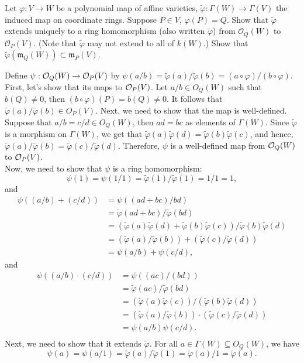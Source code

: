 \begin{exercise}
    Let $\varphi : V \to W$ be a polynomial map of affine varieties, $\tilde{\varphi} : \Gamma(W) \to \Gamma(V)$ the induced map on coordinate rings. Suppose $P \in V$, $\varphi(P) = Q$. Show that $\tilde{\varphi}$ extends uniquely to a ring homomorphism (also written $\tilde{\varphi}$) from $\mathcal{O}_Q(W)$ to $\mathcal{O}_P(V)$. (Note that $\tilde{\varphi}$ may not extend to all of $k(W)$.) Show that $\tilde{\varphi}(\mathfrak{m}_Q(W)) \subset \mathfrak{m}_P(V)$. \\
\end{exercise}

\begin{solution}
    Define $\psi : \mathcal{O}_Q(W) \to \mathcal{O}_P(V)$ by $\psi(a/b) = \tilde{\varphi}(a)/\tilde{\varphi}(b) = (a \circ \varphi)/(b \circ \varphi)$. First, let's show that its maps to $\mathcal{O}_P(V)$. Let $a/b \in O_Q(W)$ such that $b(Q) \neq 0$, then $(b\circ \varphi)(P) = b(Q) \neq 0$. It follows that $\tilde{\varphi}(a) / \tilde{\varphi}(b) \in O_P(V)$. Next, we need to show that the map is well-defined. Suppose that $a/b = c/d \in O_Q(W)$, then $ad = bc$ as elements of $\Gamma(W)$. Since $\tilde{\varphi}$ is a morphism on $\Gamma(W)$, we get that $\tilde{\varphi}(a)\tilde{\varphi}(d) = \tilde{\varphi}(b)\tilde{\varphi}(c)$, and hence, $\tilde{\varphi}(a)/\tilde{\varphi}(b) = \tilde{\varphi}(c)/\tilde{\varphi}(d)$. Therefore, $\psi$ is a well-defined map from $\mathcal{O}_Q(W)$ to $\mathcal{O}_P(V)$.\\
    
    Now, we need to show that $\psi$ is a ring homomorphism:
    $$\psi(1) = \psi(1/1) = \tilde{\varphi}(1)/\tilde{\varphi}(1) = 1/1 = 1,$$
    and
    \begin{align*}
        \psi((a/b) + (c/d)) &= \psi((ad + bc)/bd) \\
        &= \tilde{\varphi}(ad+bc)/\tilde{\varphi}(bd) \\
        &= (\tilde{\varphi}(a)\tilde{\varphi}(d) + \tilde{\varphi}(b)\tilde{\varphi}(c))/\tilde{\varphi}(b)\tilde{\varphi}(d) \\
        &= (\tilde{\varphi}(a)/\tilde{\varphi}(b)) + (\tilde{\varphi}(c)/\tilde{\varphi}(d)) \\
        &= \psi(a/b) + \psi(c/d),
    \end{align*}
    and 
    \begin{align*}
        \psi((a/b)\cdot (c/d)) &= \psi((ac)/(bd)) \\
        &= \tilde{\varphi}(ac)/\tilde{\varphi}(bd) \\
        &= (\tilde{\varphi}(a)\tilde{\varphi}(c))/(\tilde{\varphi}(b)\tilde{\varphi}(d)) \\
        &= (\tilde{\varphi}(a) / \tilde{\varphi}(b))\cdot (\tilde{\varphi}(c)/\tilde{\varphi}(d)) \\
        &= \psi(a/b)\psi(c/d).\\
    \end{align*}
    Next, we need to show that it extends $\tilde{\varphi}$. For all $a \in \Gamma(W)\subseteq O_Q(W)$, we have
    $$\psi(a) = \psi(a/1) = \tilde{\varphi}(a)/\tilde{\varphi}(1) = \tilde{\varphi}(a)/1 = \tilde{\varphi}(a).$$


\end{solution}
